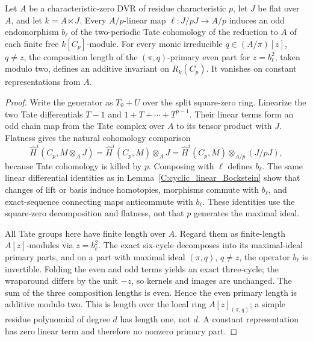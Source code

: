 \begin{lemma}
\label{C:ramified_linear_Bockstein}
Let $A$ be a characteristic-zero DVR of residue characteristic
$p$, let $J$ be flat over $A$, and let $k=A\ltimes J$.
Every $A/p$-linear map $\ell:J/pJ\to A/p$ induces an odd
endomorphism $b_\ell$ of the two-periodic Tate cohomology of the
reduction to $A$ of each finite free $k[C_p]$-module.
For every monic irreducible $q\in(A/\pi)[z]$, $q\ne z$, the
composition length of the $(\pi,q)$-primary even part for
$z=b_\ell^2$, taken modulo two, defines an additive invariant on
$R_k(C_p)$. It vanishes on constant representations from $A$.
\end{lemma}
\begin{proof}
Write the generator as $T_0+U$ over the split square-zero ring.
Linearize the two Tate differentials $T-1$ and
$1+T+\cdots+T^{p-1}$. Their linear terms form an odd chain map
from the Tate complex over $A$ to its tensor product with $J$.
Flatness gives the natural cohomology comparison
\[
 \widehat H^i(C_p,M\otimes_AJ)
 =\widehat H^i(C_p,M)\otimes_AJ
 =\widehat H^i(C_p,M)\otimes_{A/p}(J/pJ),
\]
because Tate cohomology is killed by $p$. Composing with $\ell$
defines $b_\ell$.
The same linear differential identities as in
Lemma~\ref{C:cyclic_linear_Bockstein} show that changes of lift or
basis induce homotopies, morphisms commute with $b_\ell$, and
exact-sequence connecting maps anticommute with $b_\ell$.
These identities use the square-zero decomposition and flatness,
not that $p$ generates the maximal ideal.

All Tate groups here have finite length over $A$. Regard them as
finite-length $A[z]$-modules via $z=b_\ell^2$. The exact
six-cycle decomposes into its maximal-ideal primary parts, and
on a part with maximal ideal $(\pi,q)$, $q\ne z$, the operator
$b_\ell$ is invertible. Folding the even and odd terms yields an
exact three-cycle; the wraparound differs by the unit $-z$, so
kernels and images are unchanged. The sum of the three composition
lengths is even. Hence the even primary length is additive
modulo two. This is length over the local ring
$A[z]_{(\pi,q)}$; a simple residue polynomial of degree $d$ has
length one, not $d$. A constant representation has zero linear
term and therefore no nonzero primary part.
\end{proof}

